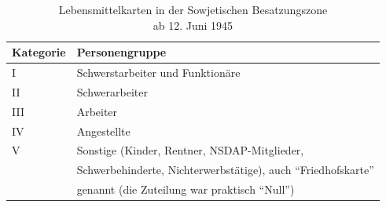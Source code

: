 \documentclass[a5paper,11pt,headings=normal,BCOR=8mm,DIV=calc]{scrbook}
\begin{document}
\begin{table}[h!]
	\label{tab:lebensmittelkarten}
	\centering	
	\begin{tabular}{l|l}
		Kategorie & Personengruppe \\
		\hline
		I & Schwerstarbeiter und Funktionäre \\
		II & Schwerarbeiter \\
		III & Arbeiter \\
		IV & Angestellte \\
		V & Sonstige (Kinder, Rentner, NSDAP-Mitglieder, \\
		& Schwerbehinderte, Nichterwerbstätige), auch \enquote{Friedhofskarte}\\
		& genannt (die Zuteilung war praktisch \enquote{Null})
	\end{tabular}
	\caption{Lebensmittelkarten in der Sowjetischen Besatzungszone\\ ab 12. Juni 1945}
\end{table}
\end{document}
